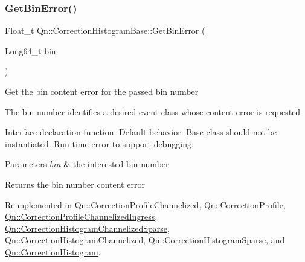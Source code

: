 \mbox{\label{classQn_1_1CorrectionHistogramBase_a50a7dd4c5bbe5e4d0e405365c2a9104d}} 
\subsubsection{\texorpdfstring{Get\+Bin\+Error()}{GetBinError()}}
{\footnotesize\ttfamily Float\+\_\+t Qn\+::\+Correction\+Histogram\+Base\+::\+Get\+Bin\+Error (\begin{DoxyParamCaption}\item[{Long64\+\_\+t}]{bin }\end{DoxyParamCaption})\hspace{0.3cm}{\ttfamily [virtual]}}

Get the bin content error for the passed bin number

The bin number identifies a desired event class whose content error is requested

Interface declaration function. Default behavior. \mbox{\hyperlink{classBase}{Base}} class should not be instantiated. Run time error to support debugging.


\begin{DoxyParams}{Parameters}
{\em bin} & the interested bin number \\
\hline
\end{DoxyParams}
\begin{DoxyReturn}{Returns}
the bin number content error 
\end{DoxyReturn}


Reimplemented in \mbox{\hyperlink{classQn_1_1CorrectionProfileChannelized_a68b390bb4d744453239bca73a1c3ca84}{Qn\+::\+Correction\+Profile\+Channelized}}, \mbox{\hyperlink{classQn_1_1CorrectionProfile_a2253439bc16a7611449b07fcfced1b53}{Qn\+::\+Correction\+Profile}}, \mbox{\hyperlink{classQn_1_1CorrectionProfileChannelizedIngress_ace03557cdc8d3f87637b0f4108308cc0}{Qn\+::\+Correction\+Profile\+Channelized\+Ingress}}, \mbox{\hyperlink{classQn_1_1CorrectionHistogramChannelizedSparse_a1b683c6af5cf7dea4d0ee9fa367e0d09}{Qn\+::\+Correction\+Histogram\+Channelized\+Sparse}}, \mbox{\hyperlink{classQn_1_1CorrectionHistogramChannelized_a5982f9fa3ce2eb199cfdd2e518c4cb4e}{Qn\+::\+Correction\+Histogram\+Channelized}}, \mbox{\hyperlink{classQn_1_1CorrectionHistogramSparse_a9b678b088ca0b21e6deb18d66ac44c2d}{Qn\+::\+Correction\+Histogram\+Sparse}}, and \mbox{\hyperlink{classQn_1_1CorrectionHistogram_ac9feeeb4721f0b199c5c96e41224836e}{Qn\+::\+Correction\+Histogram}}.

